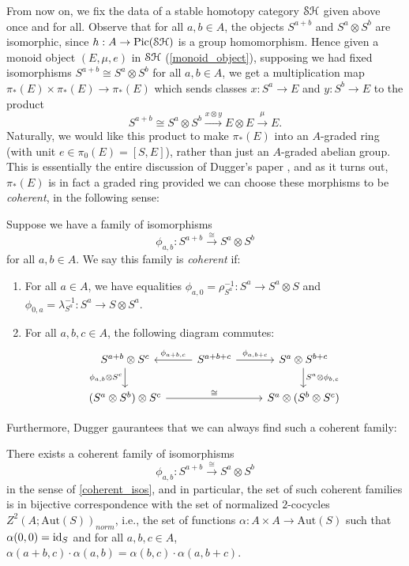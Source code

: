 \documentclass[../main.tex]{subfiles}
\begin{document}
From now on, we fix the data of a stable homotopy category $\mathcal{SH}$ given above once and for all. Observe that for all $a,b\in A$, the objects $S^{a+b}$ and $S^a\otimes S^b$ are isomorphic, since $h:A\to\operatorname{Pic}(\mathcal{SH})$ is a group homomorphism. Hence given a monoid object $(E,\mu,e)$ in $\mathcal{SH}$ (\autoref{monoid_object}), supposing we had fixed isomorphisms $S^{a+b}\cong S^a\otimes S^b$ for all $a,b\in A$, we get a multiplication map $\pi_\ast(E)\times\pi_\ast(E)\to\pi_*(E)$ which sends classes $x:S^a\to E$ and $y:S^b\to E$ to the product
\[S^{a+b}\cong S^a\otimes S^b\xrightarrow{x\otimes y}E\otimes E\xrightarrow\mu E.\]
Naturally, we would like this product to make $\pi_\ast(E)$ into an $A$-graded ring (with unit $e\in\pi_0(E)=[S,E]$), rather than just an $A$-graded abelian group. This is essentially the entire discussion of Dugger's paper \cite{Dugger_2014}, and as it turns out, $\pi_\ast(E)$ is in fact a graded ring provided we can choose these morphisms to be \emph{coherent}, in the following sense:

\begin{definition}\label{coherent_isos}
	Suppose we have a family of isomorphisms
	\[\phi_{a,b}:S^{a+b}\xrightarrow\cong S^a\otimes S^b\]
	for all $a,b\in A$. We say this family is \emph{coherent} if:
	\begin{enumerate}
		\item For all $a\in A$, we have equalities $\phi_{a,0}=\rho_{S^a}^{-1}:S^a\to S^a\otimes S$ and $\phi_{0,a}=\lambda_{S^a}^{-1}:S^a\to S\otimes S^a$.
		\item For all $a,b,c\in A$, the following diagram commutes:
		\[\begin{tikzcd}
			{S^{a+b}\otimes S^c} & {S^{a+b+c}} & {S^a\otimes S^{b+c}} \\
			{(S^a\otimes S^b)\otimes S^c} && {S^a\otimes(S^b\otimes S^c)}
			\arrow["{\phi_{a+b,c}}"', from=1-2, to=1-1]
			\arrow["{\phi_{a,b+c}}", from=1-2, to=1-3]
			\arrow["{S^a\otimes\phi_{b,c}}", from=1-3, to=2-3]
			\arrow["{\phi_{a,b}\otimes S^c}"', from=1-1, to=2-1]
			\arrow["\cong", from=2-1, to=2-3]
		\end{tikzcd}\]
	\end{enumerate}
\end{definition}

Furthermore, Dugger gaurantees that we can always find such a coherent family:

\begin{theorem}\label{coherent_existence}
	There exists a coherent family of isomorphisms
	\[\phi_{a,b}:S^{a+b}\xrightarrow\cong S^a\otimes S^b\]
	in the sense of \autoref{coherent_isos},
	and in particular, the set of such coherent families is in bijective correspondence with the set of normalized $2$-cocycles $Z^2(A;\mathrm{Aut}(S))_\mathit{norm}$, i.e., the set of functions $\alpha:A\times A\to\mathrm{Aut}(S)$ such that $\alpha(0,0)=\mathrm{id}_S$ and for all $a,b,c\in A$, $\alpha(a+b,c)\cdot\alpha(a,b)=\alpha(b,c)\cdot\alpha(a,b+c)$. 
\end{theorem}
\end{document}
